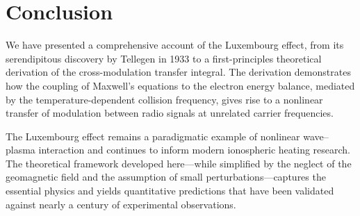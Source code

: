 \documentclass[12pt]{article}
\begin{document}
\section{Conclusion}
\label{sec:conclusion}

We have presented a comprehensive account of the Luxembourg effect, from its serendipitous
discovery by Tellegen in 1933 to a first-principles theoretical derivation of the
cross-modulation transfer integral.  The derivation demonstrates how the coupling of
Maxwell's equations to the electron energy balance, mediated by the temperature-dependent
collision frequency, gives rise to a nonlinear transfer of modulation between radio signals
at unrelated carrier frequencies.

The Luxembourg effect remains a paradigmatic example of nonlinear wave--plasma interaction
and continues to inform modern ionospheric heating research.  The theoretical framework
developed here---while simplified by the neglect of the geomagnetic field and the
assumption of small perturbations---captures the essential physics and yields quantitative
predictions that have been validated against nearly a century of experimental observations.
\end{document}
